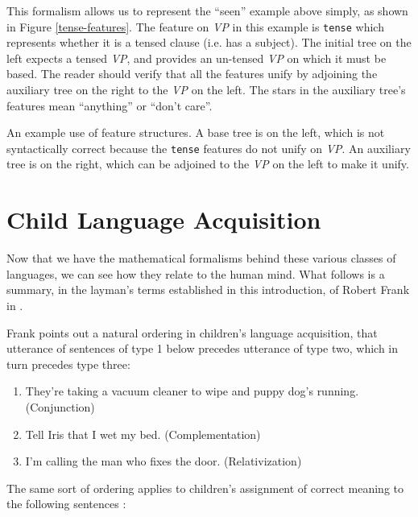 \documentclass[12pt]{article}
\begin{document}
This formalism allows us to represent the ``seen'' example above simply,
as shown in Figure \ref{tense-features}.  The feature on \textit{VP} in
this example is \texttt{tense} which represents whether it is a tensed
clause (i.e. has a subject).  The initial tree on the left expects a
tensed \textit{VP}, and provides an un-tensed \textit{VP} on which it
must be based.  The reader should verify that all the features unify by
adjoining the auxiliary tree on the right to the \textit{VP} on the
left.  The stars in the auxiliary tree's features mean ``anything'' or
``don't care''.

\begin{Figure}
\begin{center}
\end{center}
\caption{An example use of feature structures.  A base tree is on the
left, which is not syntactically correct because the \texttt{tense}
features do not unify on \textit{VP}.  An auxiliary tree is on the
right, which can be adjoined to the \textit{VP} on the left to make
it unify.}
\label{tense-features}
\end{Figure}

\section{Child Language Acquisition}
\label{sec-child-language-acquisition}

Now that we have the mathematical formalisms behind these various
classes of languages, we can see how they relate to the human mind.
What follows is a summary, in the layman's terms established in this
introduction, of Robert Frank in \cite{Frank-2000}.

Frank points out a natural ordering in children's language acquisition,
that utterance of sentences of type 1 below precedes utterance of type
two, which in turn precedes type three:

\begin{enumerate}
\item They're taking a vacuum cleaner to wipe and puppy dog's
running.  (Conjunction)
\item Tell Iris that I wet my bed. (Complementation)
\item I'm calling the man who fixes the door.  (Relativization)
\end{enumerate}

The same sort of ordering applies to children's assignment of correct
meaning to the following sentences \cite{Bloom-1980}:
\end{document}
